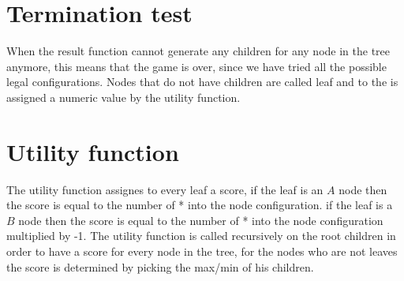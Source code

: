 \documentclass{article}
\begin{document}
\section*{Termination test}
When the result function cannot generate any children for any node in the tree anymore, this means that the game is over, since we have tried all the possible legal configurations. Nodes that do not have children are called leaf and to the is assigned a numeric value by the utility function.

\section*{Utility function}
The utility function assignes to every leaf a score, if the leaf is an $A$ node then the score is equal to the number of * into the node configuration. if the leaf is a $B$ node then the score is equal to the number of * into the node configuration multiplied by -1. The utility function is called recursively on the root children in order to have a score for every node in the tree, for the nodes who are not leaves the score is determined by picking the max/min of his children.
\end{document}
